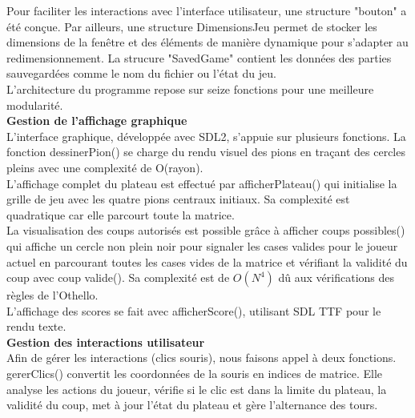 \documentclass[12pt, a4paper, oneside]{article}
\begin{document}
            Pour faciliter les interactions avec l'interface utilisateur, une structure "bouton" a été conçue. 
            Par ailleurs, une structure DimensionsJeu permet de stocker les dimensions de la fenêtre et des éléments de manière 
            dynamique pour s'adapter au redimensionnement. La strucure "SavedGame" contient les données des parties sauvegardées 
            comme le nom du fichier ou l'état du jeu. \\

            L'architecture du programme repose sur seize fonctions pour une meilleure modularité. \\
    
        \textbf{Gestion de l'affichage graphique} \\
            L'interface graphique, développée avec SDL2, s'appuie sur plusieurs fonctions. 
            La fonction dessinerPion() se charge du rendu visuel des pions en traçant des cercles pleins avec une complexité de O(rayon). \\

            L'affichage complet du plateau est effectué par afficherPlateau() qui initialise la grille de jeu avec les quatre pions 
            centraux initiaux. Sa complexité est quadratique car elle parcourt toute la matrice. \\

            La visualisation des coups autorisés est possible grâce à afficher\textunderscore
            coups\textunderscore
            possibles() qui affiche un cercle non plein 
            noir pour signaler les cases valides pour le joueur actuel en parcourant toutes les cases vides de la matrice et vérifiant 
            la validité du coup avec coup\textunderscore
            valide(). Sa complexité est de $O(N^4)$ dû aux vérifications des règles de l'Othello. \\

            L'affichage des scores se fait avec afficherScore(), utilisant SDL\textunderscore
            TTF pour le rendu texte. \\
    
        \textbf{Gestion des interactions utilisateur} \\
            Afin de gérer les interactions (clics souris), nous faisons appel à deux fonctions.
            gererClics() convertit les coordonnées de la souris en indices de matrice. Elle analyse les actions du joueur, 
            vérifie si le clic est dans la limite du plateau, la validité du coup, met à jour l'état du plateau et 
            gère l'alternance des tours. \\
            
\end{document}
